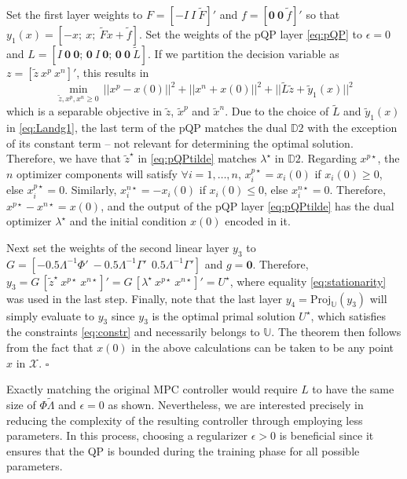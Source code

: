 Set the first layer weights to $F = [-I \ I \ \tilde{F}]'$ and $f = [\bm{0} \ \bm{0} \ \tilde{f}]'$ so that $y_1(x) = [-x; \ x; \ \tilde{F}x + \tilde{f}]$. Set the weights of the pQP layer \eqref{eq:pQP} to $\epsilon = 0$ and $L = [I \ \bm{0} \ \bm{0}; \, \bm{0} \ I \ \bm{0}; \, \bm{0} \ \bm{0} \ \tilde{L}]$. If we partition the decision variable as $z = [\tilde{z} \ x^p \ x^n]'$, this results in 
\begin{equation}
	\label{eq:pQPtilde}
	\min_{\tilde{z},x^p,x^n \geq 0} \, ||x^p - x(0)||^{2} + ||x^n + x(0)||^{2} + ||\tilde{L}\tilde{z} + \tilde{y}_1(x)||^{2} 
\end{equation}
which is a separable objective in $\tilde{z}$, $\tilde{x}^p$ and $\tilde{x}^n$. Due to the choice of $\tilde{L}$ and $\tilde{y}_1(x)$ in \eqref{eq:Landg1}, the last term of the pQP matches the dual $\mathds{D}2$ with the exception of its constant term -- not relevant for determining the optimal solution. Therefore, we have that $\tilde{z}^\star$ in \eqref{eq:pQPtilde} matches $\lambda^\star$ in $\mathds{D}2$. Regarding $x^{p\star}$, the $n$ optimizer components will satisfy $\forall i = 1,\dots,n$, $x^{p\star}_i = x_i(0)$ if $x_i(0) \geq 0$, else $x^{p\star}_i = 0$. Similarly, $x^{n\star}_i = -x_i(0)$ if $x_i(0) \leq 0$, else $x^{n\star}_i = 0$. Therefore, $x^{p\star} - x^{n\star} = x(0)$, and the output of the pQP layer \eqref{eq:pQPtilde} has the dual optimizer $\lambda^\star$ and the initial condition $x(0)$ encoded in it.

Next set the weights of the second linear layer $y_3$ to $G = [- 0.5 \Lambda^{-1}\Phi' \ -0.5 \Lambda^{-1}\Gamma' \ \ 0.5\Lambda^{-1}\Gamma']$ and $g = \bm{0}$. Therefore, $y_3 = G \, [\tilde{z}^\star \ x^{p \star} \ x^{n\star}]' = G \, [\lambda^\star \ x^{p \star} \ x^{n\star}]' = U^\star$, where equality \eqref{eq:stationarity} was used in the last step. Finally, note that the last layer $y_4 = \text{Proj}_{\mathbb{U}}(y_3)$ will simply evaluate to $y_3$ since $y_3$ is the optimal primal solution $U^\star$, which satisfies the constraints \eqref{eq:constr} and necessarily belongs to $\mathbb{U}$. The theorem then follows from the fact that $x(0)$ in the above calculations can be taken to be any point $x$ in $\mathcal{X}$. $\square$

Exactly matching the original MPC controller would require $L$ to have the same size of $\Phi \tilde{\Lambda}$ and $\epsilon = 0$ as shown. Nevertheless, we are interested precisely in reducing the complexity of the resulting controller through employing less parameters. In this process, choosing a regularizer $\epsilon > 0$ is beneficial since it ensures that the QP is bounded during the training phase for all possible parameters.

